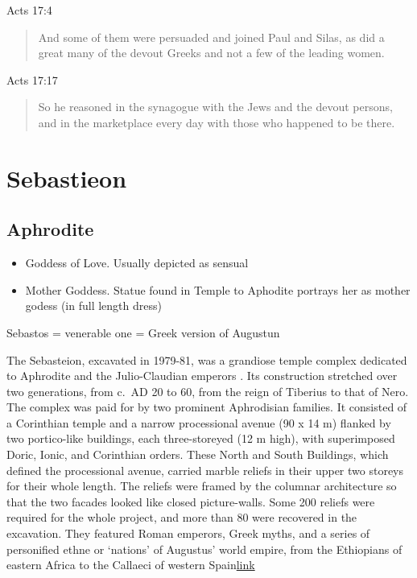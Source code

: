 \documentclass[
]{book}
\begin{document}
Acts 17:4

\begin{quote}
And some of them were persuaded and joined Paul and Silas, as did a great many of the devout Greeks and not a few of the leading women.
\end{quote}

Acts 17:17

\begin{quote}
So he reasoned in the synagogue with the Jews and the devout persons, and in the marketplace every day with those who happened to be there.
\end{quote}

\hypertarget{sebastieon}{%
\section{Sebastieon}\label{sebastieon}}

\hypertarget{aphrodite}{%
\subsection{Aphrodite}\label{aphrodite}}

\begin{itemize}
\item
  Goddess of Love. Usually depicted as sensual
\item
  Mother Goddess. Statue found in Temple to Aphodite portrays her as mother godess (in full length dress)
\end{itemize}

Sebastos = venerable one = Greek version of Augustun

The Sebasteion, excavated in 1979-81, was a grandiose temple complex dedicated to Aphrodite and the Julio-Claudian emperors . Its construction stretched over two generations, from c.~AD 20 to 60, from the reign of Tiberius to that of Nero. The complex was paid for by two prominent Aphrodisian families. It consisted of a Corinthian temple and a narrow processional avenue (90 x 14 m) flanked by two portico-like buildings, each three-storeyed (12 m high), with superimposed Doric, Ionic, and Corinthian orders. These North and South Buildings, which defined the processional avenue, carried marble reliefs in their upper two storeys for their whole length. The reliefs were framed by the columnar architecture so that the two facades looked like closed picture-walls. Some 200 reliefs were required for the whole project, and more than 80 were recovered in the excavation. They featured Roman emperors, Greek myths, and a series of personified ethne or `nations' of Augustus' world empire, from the Ethiopians of eastern Africa to the Callaeci of western Spain\href{http://aphrodisias.classics.ox.ac.uk/sebasteion.html}{link}
\end{document}
